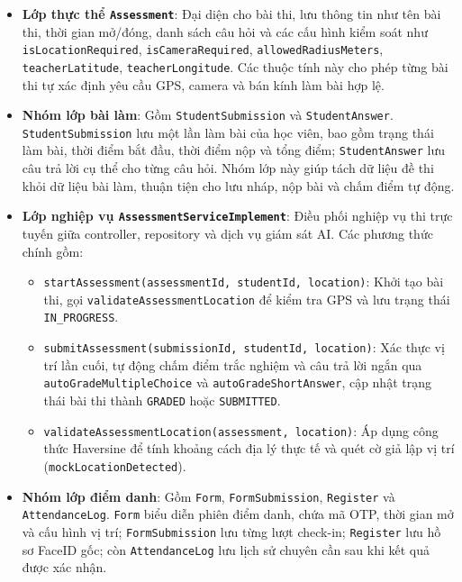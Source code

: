 \documentclass[../DoAn.tex]{subfiles}
\begin{document}
\begin{itemize}
    \item \textbf{Lớp thực thể \texttt{Assessment}}: Đại diện cho bài thi, lưu thông tin như tên bài thi, thời gian mở/đóng, danh sách câu hỏi và các cấu hình kiểm soát như \texttt{isLocationRequired}, \texttt{isCameraRequired}, \texttt{allowedRadiusMeters}, \texttt{teacherLatitude}, \texttt{teacherLongitude}. Các thuộc tính này cho phép từng bài thi tự xác định yêu cầu GPS, camera và bán kính làm bài hợp lệ.
    
    \item \textbf{Nhóm lớp bài làm}: Gồm \texttt{StudentSubmission} và \texttt{StudentAnswer}. \texttt{StudentSubmission} lưu một lần làm bài của học viên, bao gồm trạng thái làm bài, thời điểm bắt đầu, thời điểm nộp và tổng điểm; \texttt{StudentAnswer} lưu câu trả lời cụ thể cho từng câu hỏi. Nhóm lớp này giúp tách dữ liệu đề thi khỏi dữ liệu bài làm, thuận tiện cho lưu nháp, nộp bài và chấm điểm tự động.
    
    \item \textbf{Lớp nghiệp vụ \texttt{AssessmentServiceImplement}}: Điều phối nghiệp vụ thi trực tuyến giữa controller, repository và dịch vụ giám sát AI. Các phương thức chính gồm:
    \begin{itemize}
        \item \texttt{startAssessment(assessmentId, studentId, location)}: Khởi tạo bài thi, gọi \texttt{validateAssessmentLocation} để kiểm tra GPS và lưu trạng thái \texttt{IN\_PROGRESS}.
        \item \texttt{submitAssessment(submissionId, studentId, location)}: Xác thực vị trí lần cuối, tự động chấm điểm trắc nghiệm và câu trả lời ngắn qua \texttt{autoGradeMultipleChoice} và \texttt{autoGradeShortAnswer}, cập nhật trạng thái bài thi thành \texttt{GRADED} hoặc \texttt{SUBMITTED}.
        \item \texttt{validateAssessmentLocation(assessment, location)}: Áp dụng công thức Haversine \cite{sinnott1984virtues} để tính khoảng cách địa lý thực tế và quét cờ giả lập vị trí (\texttt{mockLocationDetected}).
    \end{itemize}
    
    \item \textbf{Nhóm lớp điểm danh}: Gồm \texttt{Form}, \texttt{FormSubmission}, \texttt{Register} và \texttt{AttendanceLog}. \texttt{Form} biểu diễn phiên điểm danh, chứa mã OTP, thời gian mở và cấu hình vị trí; \texttt{FormSubmission} lưu từng lượt check-in; \texttt{Register} lưu hồ sơ FaceID gốc; còn \texttt{AttendanceLog} lưu lịch sử chuyên cần sau khi kết quả được xác nhận.
    

\end{itemize}
\end{document}
